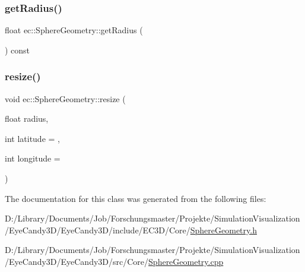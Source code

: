 \mbox{\label{classec_1_1_sphere_geometry_a297fbaec8341dbb2dd0023b0d90d4e24}} 
\subsubsection{\texorpdfstring{get\+Radius()}{getRadius()}}
{\footnotesize\ttfamily float ec\+::\+Sphere\+Geometry\+::get\+Radius (\begin{DoxyParamCaption}{ }\end{DoxyParamCaption}) const}

\mbox{\label{classec_1_1_sphere_geometry_a44eb0096b6f9c6a98a7c325032c04c41}} 
\subsubsection{\texorpdfstring{resize()}{resize()}}
{\footnotesize\ttfamily void ec\+::\+Sphere\+Geometry\+::resize (\begin{DoxyParamCaption}\item[{float}]{radius,  }\item[{int}]{latitude = {},  }\item[{int}]{longitude = {} }\end{DoxyParamCaption})}



The documentation for this class was generated from the following files\+:\begin{DoxyCompactItemize}
\item 
D\+:/\+Library/\+Documents/\+Job/\+Forschungsmaster/\+Projekte/\+Simulation\+Visualization/\+Eye\+Candy3\+D/\+Eye\+Candy3\+D/include/\+E\+C3\+D/\+Core/\mbox{\hyperlink{_sphere_geometry_8h}{Sphere\+Geometry.\+h}}\item 
D\+:/\+Library/\+Documents/\+Job/\+Forschungsmaster/\+Projekte/\+Simulation\+Visualization/\+Eye\+Candy3\+D/\+Eye\+Candy3\+D/src/\+Core/\mbox{\hyperlink{_sphere_geometry_8cpp}{Sphere\+Geometry.\+cpp}}\end{DoxyCompactItemize}

